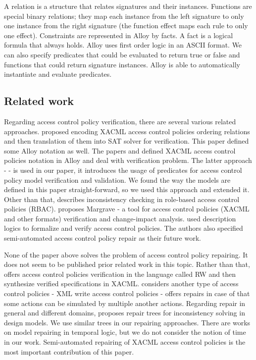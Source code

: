 \documentclass{acm_proc_article-sp}
\begin{document}
A relation is a structure that relates signatures and their instances. Functions are special binary relations; they map each instance from the left signature to only one instance from the right signature (the function effect maps each rule to only one effect). Constraints are represented in Alloy by facts. A fact is a logical formula that always holds. Alloy uses first order logic in an ASCII format. We can also specify predicates that could be evaluated to return true or false and functions that could return signature instances. Alloy is able to automatically instantiate and evaluate predicates.

\subsection{Related work}

Regarding access control policy verification, there are several various related approaches.
\cite{Hughes:2008:AVA:1459278.1459282} proposed encoding XACML access control policies  ordering relations and then translation of them into SAT solver for verification. This paper defined some Alloy notation as well.  The papers \cite{acp:automated} and \cite{acp:alloy} defined XACML access control policies notation in Alloy and deal with verification problem. The latter approach - \cite{acp:alloy} - is used in our paper, it introduces the usage of predicates for access control policy model verification and validation. We found the way the models are defined in this paper straight-forward, so we used this approach and extended it. Other than that, \cite{4258517} describes inconsistency checking in role-based access control policies (RBAC). \cite{Fisler:2005:VCA:1062455.1062502} proposes Margrave - a tool for access control policies (XACML and other formats) verification and change-impact analysis. \cite {acp:descriptionlogics} used description logics to formalize and verify access control policies. The authors also specified semi-automated access control policy repair as their future work.

None of the paper above solves the problem of access control policy repairing. It does not seem to be published prior related work in this topic. Rather than that, \cite{Zhang:2004:SVA:1029133.1029141} offers access control policies verification in the language called RW and then synthesize verified specifications in XACML. \cite{Bravo:2007:RIX:1783534.1783545} considers another type of access control policies - XML write access control policies - offers repairs in case of that some actions can be simulated by multiple another actions. Regarding repair in general and different domains, \cite{Reder:2012:CRT:2351676.2351707} proposes repair trees for inconsistency solving in design models. We use similar trees in our repairing approaches. There are works on model repairing in temporal logic, but we do not consider the notion of time in our work. Semi-automated repairing of XACML access control policies is the most important contribution of this paper. 
\end{document}
